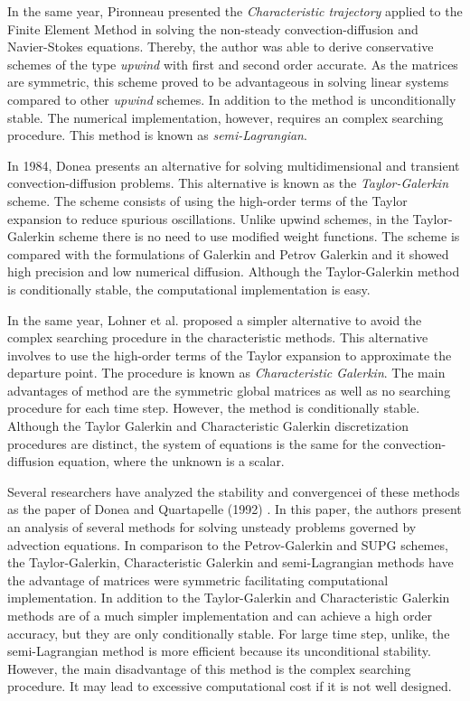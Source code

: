 \medskip
In the same year, Pironneau \cite{pironneau1982} presented
 the \textit{Characteristic trajectory}
 applied to the
 Finite Element Method in solving the non-steady convection-diffusion
 and Navier-Stokes equations. Thereby, the author was able
 to derive conservative schemes of the type \textit{upwind}
 with first and second order accurate. As the matrices are symmetric,
 this scheme proved to be advantageous in solving linear
 systems compared to other \textit{upwind} schemes.
 In addition to the method is unconditionally stable.
 The numerical implementation, however, requires an complex searching
 procedure. This method is known as \textit{semi-Lagrangian}.

\medskip
In 1984, Donea \cite{donea1984} presents an alternative for
 solving multidimensional and transient convection-diffusion
 problems. This alternative is known as the
 \textit{Taylor-Galerkin} scheme. The scheme consists of using
 the high-order terms of the Taylor expansion to reduce
 spurious oscillations. Unlike upwind schemes, in the
 Taylor-Galerkin scheme there is no need to use modified
 weight functions. The scheme is compared with the formulations
 of Galerkin and Petrov Galerkin and it showed high precision and
 low numerical diffusion. Although the Taylor-Galerkin method
 is conditionally stable, the computational implementation is easy.


\medskip
In the same year, Lohner et al. \cite{lohner1984} 
proposed a simpler alternative
to avoid the complex searching procedure in the characteristic
methods. This alternative involves to use the high-order terms of
the Taylor expansion to approximate the departure point.
The procedure is known as \textit{Characteristic Galerkin}.
The main advantages of method are the symmetric global matrices
as well as no searching procedure for each time step. However, the
method is conditionally stable.
Although the Taylor Galerkin and
 Characteristic Galerkin discretization procedures are distinct,
 the system of equations is the same for the convection-diffusion
 equation, where the unknown is a scalar.


\medskip
Several researchers have analyzed the stability and convergencei
 of these methods as the paper of Donea and Quartapelle (1992)
\cite{donea1992}. In this paper, the authors present an analysis
of several methods for solving unsteady problems governed by
advection equations. 
In comparison to the Petrov-Galerkin and
 SUPG schemes, the Taylor-Galerkin, Characteristic Galerkin and
 semi-Lagrangian methods have the advantage of matrices were
 symmetric facilitating computational implementation.
 In addition to the Taylor-Galerkin and Characteristic Galerkin methods
 are of a much simpler implementation and can achieve a high order
accuracy, but they are only conditionally stable.
 For large time step, unlike, the semi-Lagrangian method is
 more efficient because its unconditional stability.
 However, the main disadvantage of this method is the complex 
 searching procedure. It may lead to excessive computational cost
 if it is not well designed.

